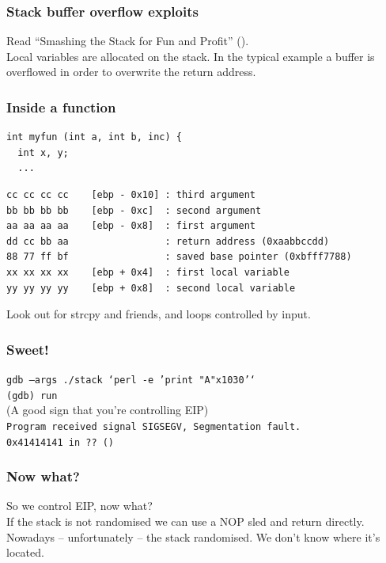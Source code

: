 \documentclass[slidestop,compress,mathserif, xcolor=table]{beamer}
\begin{document}
\begin{frame}
  \frametitle{Stack buffer overflow exploits}

  Read ``Smashing the Stack for Fun and Profit'' (\cite{alephone1996}).\\[1em]

  Local variables are allocated on the stack. In the typical example a buffer is
  overflowed in order to overwrite the return address.
\end{frame}

\begin{frame}[fragile]
  \frametitle{Inside a function}

{\tiny
\begin{verbatim}
int myfun (int a, int b, inc) {
  int x, y;
  ...
\end{verbatim}
\begin{verbatim}
cc cc cc cc    [ebp - 0x10] : third argument
bb bb bb bb    [ebp - 0xc]  : second argument
aa aa aa aa    [ebp - 0x8]  : first argument
dd cc bb aa                 : return address (0xaabbccdd)
88 77 ff bf                 : saved base pointer (0xbfff7788)
xx xx xx xx    [ebp + 0x4]  : first local variable
yy yy yy yy    [ebp + 0x8]  : second local variable
\end{verbatim}
}
Look out for strcpy and friends, and loops controlled by input.
\end{frame}

\begin{frame}
  \frametitle{Sweet!}

  {\small
    \texttt{gdb --args ./stack `perl -e 'print "A"x1030'`}\\
    \texttt{(gdb) run}
  }\\[1em]

  (A good sign that you're controlling EIP)\\[1em]

  {\small
    \texttt{Program received signal SIGSEGV, Segmentation fault.}\\
    \texttt{0x41414141 in ?? ()}
  }
\end{frame}

\begin{frame}
  \frametitle{Now what?}

  So we control EIP, now what?\\[1em]

  If the stack is not randomised we can use a NOP sled and return
  directly.\\[1em]

  Nowadays -- unfortunately -- the stack randomised. We don't know where it's
  located.
\end{frame}
\end{document}
